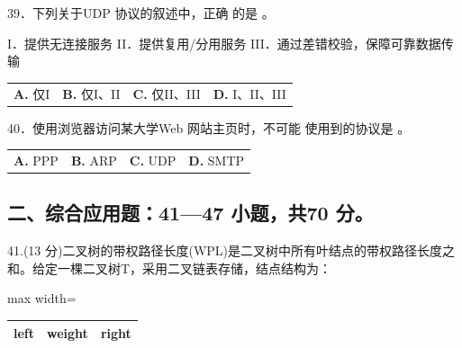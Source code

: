 \documentclass[UTF8,11pt]{ctexart}
\begin{document}
39．下列关于UDP 协议的叙述中，正确 的是 。


I．提供无连接服务 II．提供复用/分用服务 III．通过差错校验，保障可靠数据传输


\begin{center}\begin{tabular}{>{\raggedright\arraybackslash}p{\dimexpr(\linewidth-8\tabcolsep)/4\relax}>{\raggedright\arraybackslash}p{\dimexpr(\linewidth-8\tabcolsep)/4\relax}>{\raggedright\arraybackslash}p{\dimexpr(\linewidth-8\tabcolsep)/4\relax}>{\raggedright\arraybackslash}p{\dimexpr(\linewidth-8\tabcolsep)/4\relax}}
\textbf{A.} 仅I & \textbf{B.} 仅I、II & \textbf{C.} 仅II、III & \textbf{D.} I、II、III\\[.35em]\end{tabular}\end{center}

40．使用浏览器访问某大学Web 网站主页时，不可能 使用到的协议是 。


\begin{center}\begin{tabular}{>{\raggedright\arraybackslash}p{\dimexpr(\linewidth-8\tabcolsep)/4\relax}>{\raggedright\arraybackslash}p{\dimexpr(\linewidth-8\tabcolsep)/4\relax}>{\raggedright\arraybackslash}p{\dimexpr(\linewidth-8\tabcolsep)/4\relax}>{\raggedright\arraybackslash}p{\dimexpr(\linewidth-8\tabcolsep)/4\relax}}
\textbf{A.} PPP & \textbf{B.} ARP & \textbf{C.} UDP & \textbf{D.} SMTP\\[.35em]\end{tabular}\end{center}

\subsection*{二、综合应用题：41—47 小题，共70 分。}

41.(13 分)二叉树的带权路径长度(WPL)是二叉树中所有叶结点的带权路径长度之和。给定一棵二叉树T，采用二叉链表存储，结点结构为：


\begin{center}\begin{adjustbox}{max width=\linewidth}\begin{tabular}{|>{\raggedright\arraybackslash}p{\dimexpr(\linewidth-6\tabcolsep-4\arrayrulewidth)/3\relax}|>{\raggedright\arraybackslash}p{\dimexpr(\linewidth-6\tabcolsep-4\arrayrulewidth)/3\relax}|>{\raggedright\arraybackslash}p{\dimexpr(\linewidth-6\tabcolsep-4\arrayrulewidth)/3\relax}|}\hline
left & weight & right\\\hline\end{tabular}\end{adjustbox}\end{center}
\end{document}
